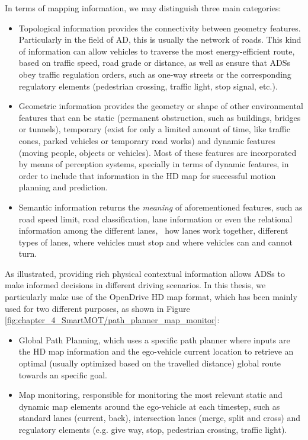 In terms of mapping information, we may distinguish three main categories:

\begin{itemize}
	
	\item Topological information provides the connectivity between geometry features. Particularly in the field of \ac{AD}, this is usually the network of roads. This kind of information can allow vehicles to traverse the most energy-efficient route, based on traffic speed, road grade or distance, as well as ensure that \acp{ADS} obey traffic regulation orders, such as one-way streets or the corresponding regulatory elements (pedestrian crossing, traffic light, stop signal, etc.).
	
	\item Geometric information provides the geometry or shape of other environmental features that can be static (permanent obstruction, such as buildings, bridges or tunnels), temporary (exist for only a limited amount of time, like traffic cones, parked vehicles or temporary road works) and dynamic features (moving people, objects or vehicles). Most of these features are incorporated by means of perception systems, specially in terms of dynamic features, in order to include that information in the HD map for successful motion planning and prediction.
	
	\item Semantic information returns the \textit{meaning} of aforementioned features, such as road speed limit, road classification, lane information or even the relational information among the different lanes, \ie \ how lanes work together, different types of lanes, where vehicles must stop and where vehicles can and cannot turn.
\end{itemize}

As illustrated, providing rich physical contextual information allows \acp{ADS} to make informed decisions in different driving scenarios. In this thesis, we particularly make use of the OpenDrive \cite{dupuis2010opendrive} HD map format, which has been mainly used for two different purposes, as shown in Figure \ref{fig:chapter_4_SmartMOT/path_planner_map_monitor}:

\begin{itemize}
	
	\item Global Path Planning, which uses a specific path planner where inputs are the HD map information and the ego-vehicle current location to retrieve an optimal (usually optimized based on the travelled distance) global route towards an specific goal.
	
	\item Map monitoring, responsible for monitoring the most relevant static and dynamic map elements around the ego-vehicle at each timestep, such as standard lanes (current, back), intersection lanes (merge, split and cross) and regulatory elements (e.g. give way, stop, pedestrian crossing, traffic light).
	
\end{itemize}

